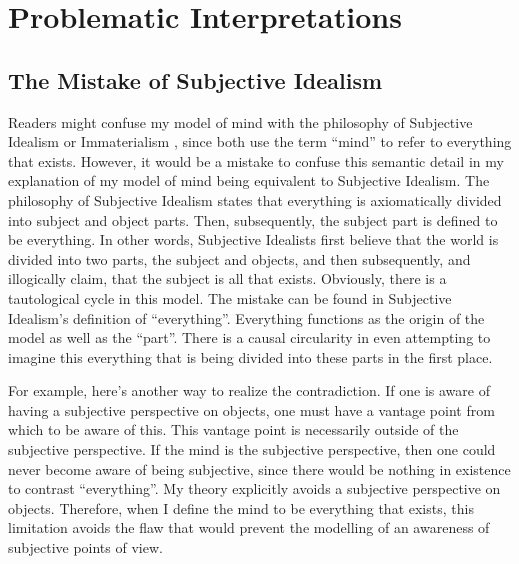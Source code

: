 \chapter{Problematic Interpretations}
\label{chapter:problematic_interpretations}

\section{The Mistake of Subjective Idealism}
\label{section:the_mistake_of_subjective_idealism}

Readers might confuse my model of mind with the philosophy of
Subjective Idealism or Immaterialism \citep{berkeley:1734}, since both
use the term ``mind'' to refer to everything that exists.  However, it
would be a mistake to confuse this semantic detail in my explanation
of my model of mind being equivalent to Subjective Idealism.  The
philosophy of Subjective Idealism states that everything is
axiomatically divided into subject and object parts.  Then,
subsequently, the subject part is defined to be everything.  In other
words, Subjective Idealists first believe that the world is divided
into two parts, the subject and objects, and then subsequently, and
illogically claim, that the subject is all that exists.  Obviously,
there is a tautological cycle in this model.  The mistake can be found
in Subjective Idealism's definition of ``everything''.  Everything
functions as the origin of the model as well as the ``part''.  There
is a causal circularity in even attempting to imagine this everything
that is being divided into these parts in the first place.

For example, here's another way to realize the contradiction.  If one
is aware of having a subjective perspective on objects, one must have
a vantage point from which to be aware of this.  This vantage point is
necessarily outside of the subjective perspective.  If the mind is the
subjective perspective, then one could never become aware of being
subjective, since there would be nothing in existence to contrast
``everything''.  My theory explicitly avoids a subjective perspective
on objects.  Therefore, when I define the mind to be everything that
exists, this limitation avoids the flaw that would prevent the
modelling of an awareness of subjective points of view.

